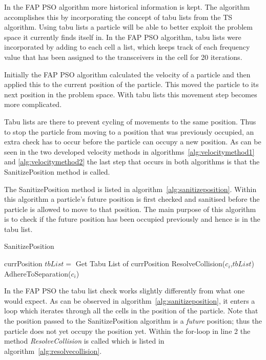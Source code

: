 In the \gls{FAP} \gls{PSO} algorithm more historical information is kept. The algorithm accomplishes this by incorporating the concept of tabu lists from the \gls{TS} algorithm. Using tabu lists a particle will be able to better exploit the problem space it currently finds itself in. In the \gls{FAP} \gls{PSO} algorithm, tabu lists were incorporated by adding to each cell a list, which keeps track of each frequency value that has been assigned to the transceivers in the cell for 20 iterations.

Initially the \gls{FAP} \gls{PSO} algorithm calculated the velocity of a particle and then applied this to the current position of the particle. This moved the particle to its next position in the problem space. With tabu lists this movement step becomes more complicated.

Tabu lists are there to prevent cycling of movements to the same position. Thus to stop the particle from moving to a position that was previously occupied, an extra check has to occur before the particle can occupy a new position. As can be seen in the two developed velocity methods in algorithms~\ref{alg:velocitymethod1} and \ref{alg:velocitymethod2} the last step that occurs in both algorithms is that the SanitizePosition method is called.


The SanitizePosition method is listed in algorithm~\ref{alg:sanitizeposition}. Within this algorithm a particle's future position is first checked and sanitised before the particle is allowed to move to that position. The main purpose of this algorithm is to check if the future position has been occupied previously and hence is in the tabu list.
\begin{algorithm}[H]
\caption{SanitizePosition}
\label{alg:sanitizeposition}
\begin{algorithmic}[1]
	\Require currPosition
		\State $tbList = $ Get Tabu List of currPosition
		\State ResolveCollision($c_i$,$tbList$)
		\State AdhereToSeparation($c_i$)
	\EndFor
\end{algorithmic}
\end{algorithm}


In the \gls{FAP} \gls{PSO} the tabu list check works slightly differently from what one would expect. As can be observed in algorithm~\ref{alg:sanitizeposition}, it enters a loop which iterates through all the cells in the position of the particle. Note that the position passed to the SanitizePosition algorithm is a \emph{future} position; thus the particle does not yet occupy the position yet. Within the for-loop in line 2 the method \emph{ResolveCollision} is called which is listed in algorithm~\ref{alg:resolvecollision}.

